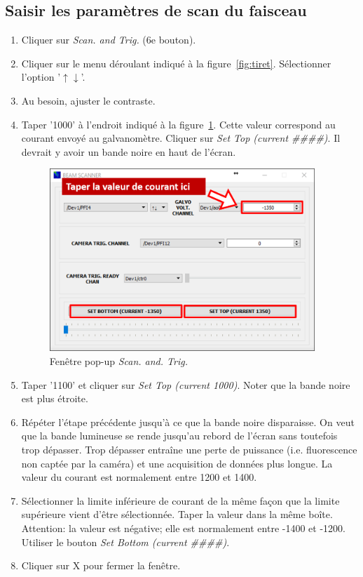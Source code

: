 \subsection{Saisir les paramètres de scan du faisceau}
\begin{enumerate}
    \item Cliquer sur \textit{Scan. and Trig.} (6e bouton).
    \item Cliquer sur le menu déroulant indiqué à la figure~\ref{fig:tiret}. Sélectionner l'option '$\uparrow\downarrow$'.
    \item Au besoin, ajuster le contraste.
    \item Taper '1000' à l'endroit indiqué à la figure~\ref{fig:courant}. Cette valeur correspond au courant envoyé au galvanomètre. Cliquer sur \textit{Set Top (current \#\#\#\#)}. Il devrait y avoir un bande noire en haut de l'écran.
        \begin{figure}[H]
        \centering
        \includegraphics[width=10cm]{current.png}
        \caption{Fenêtre pop-up \textit{Scan. and. Trig.}}
        \label{fig:courant}
        \end{figure}
    \item Taper '1100' et cliquer sur \textit{Set Top (current 1000)}. Noter que la bande noire est plus étroite.
    \item Répéter l'étape précédente jusqu'à ce que la bande noire disparaisse. On veut que la bande lumineuse se rende jusqu'au rebord de l'écran sans toutefois trop dépasser. Trop dépasser entraîne une perte de puissance (i.e. fluorescence non captée par la caméra) et une acquisition de données plus longue. La valeur du courant est normalement entre 1200 et 1400.
    \item Sélectionner la limite inférieure de courant de la même façon que la limite supérieure vient d'être sélectionnée. Taper la valeur dans la même boîte. Attention: la valeur est négative; elle est normalement entre -1400 et -1200. Utiliser le bouton \textit{Set Bottom (current \#\#\#\#)}.
    \item Cliquer sur X pour fermer la fenêtre.
\end{enumerate}
